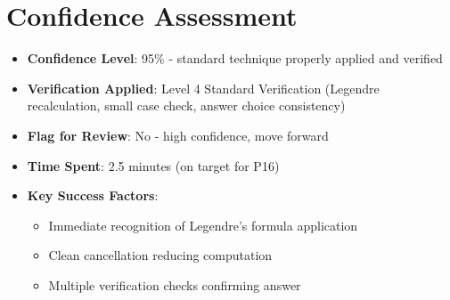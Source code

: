 \documentclass[]{article}
\begin{document}
\section*{Confidence Assessment}
\begin{itemize}[leftmargin=*]
    \item \textbf{Confidence Level}: 95\% - standard technique properly applied and verified
    \item \textbf{Verification Applied}: Level 4 Standard Verification (Legendre recalculation, small case check, answer choice consistency)
    \item \textbf{Flag for Review}: No - high confidence, move forward
    \item \textbf{Time Spent}: 2.5 minutes (on target for P16)
    \item \textbf{Key Success Factors}: 
    \begin{itemize}
        \item Immediate recognition of Legendre's formula application
        \item Clean cancellation reducing computation
        \item Multiple verification checks confirming answer
    \end{itemize}
\end{itemize}
\end{document}
